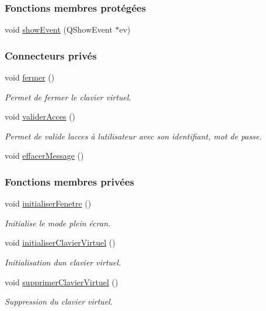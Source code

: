\subsubsection*{Fonctions membres protégées}
\begin{DoxyCompactItemize}
\item 
void \hyperlink{class_ihm_authentification_sans_badge_ad60d540d145d0bb940ccbb0850de2c35}{show\+Event} (Q\+Show\+Event $\ast$ev)
\end{DoxyCompactItemize}
\subsubsection*{Connecteurs privés}
\begin{DoxyCompactItemize}
\item 
void \hyperlink{class_ihm_authentification_sans_badge_aa06ddc2a4b8d578fecfb9e37dd577858}{fermer} ()
\begin{DoxyCompactList}\small\item\em Permet de fermer le clavier virtuel. \end{DoxyCompactList}\item 
void \hyperlink{class_ihm_authentification_sans_badge_a1d6f062da30edd3ba8fe74906e8f16cf}{valider\+Acces} ()
\begin{DoxyCompactList}\small\item\em Permet de valide l\textquotesingle{}acces à l\textquotesingle{}utilisateur avec son identifiant, mot de passe. \end{DoxyCompactList}\item 
void \hyperlink{class_ihm_authentification_sans_badge_a6dfdc8197ea602634455e80b35af7c87}{effacer\+Message} ()
\end{DoxyCompactItemize}
\subsubsection*{Fonctions membres privées}
\begin{DoxyCompactItemize}
\item 
void \hyperlink{class_ihm_authentification_sans_badge_a5804d43d13e39e3e4890f7b08c89cb6c}{initialiser\+Fenetre} ()
\begin{DoxyCompactList}\small\item\em Initialise le mode plein écran. \end{DoxyCompactList}\item 
void \hyperlink{class_ihm_authentification_sans_badge_aa273ef3009c84c8f5f48e4d3591df8e7}{initialiser\+Clavier\+Virtuel} ()
\begin{DoxyCompactList}\small\item\em Initialisation d\textquotesingle{}un clavier virtuel. \end{DoxyCompactList}\item 
void \hyperlink{class_ihm_authentification_sans_badge_ab90d91062763a53ac39df5a9fdc4da85}{supprimer\+Clavier\+Virtuel} ()
\begin{DoxyCompactList}\small\item\em Suppression du clavier virtuel. \end{DoxyCompactList}\end{DoxyCompactItemize}
